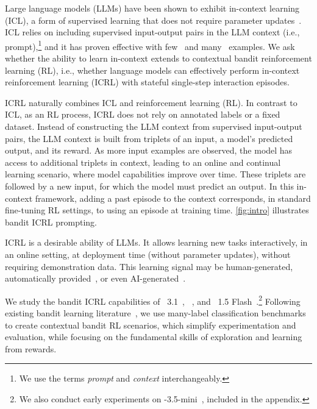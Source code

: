 Large language models (LLMs) have been shown to exhibit in-context learning (ICL), a form of supervised learning that does not require parameter updates~\citep{brown2020language}. 
ICL relies on including supervised input-output pairs in the LLM context (i.e., prompt),\footnote{We use the terms \emph{prompt} and \emph{context} interchangeably.} and it has proven effective with few~\citep{brown2020language} and many~\citep{bertsch2024incontext, agarwal2024manyshotincontextlearning} examples.
We ask whether the ability to learn in-context extends to contextual bandit reinforcement learning (RL), i.e., whether language models can effectively perform in-context reinforcement learning (ICRL) with stateful single-step interaction episodes. 

ICRL naturally combines ICL and reinforcement learning (RL). 
In contrast to ICL, as an RL process, ICRL does not rely on annotated labels or a fixed dataset. Instead of constructing the LLM context from supervised input-output pairs, the LLM context is built from triplets of an input, a model's predicted output, and its reward. As more input examples are observed, the model has access to additional triplets in context, leading to an online and continual learning scenario, where model capabilities improve over time. These triplets are followed by a new input, for which the model must predict an output. In this in-context framework, adding a past episode to the context corresponds, in standard fine-tuning RL settings, to using an episode at training time. \autoref{fig:intro} illustrates bandit ICRL prompting. 

ICRL is a desirable ability of LLMs. It allows learning new tasks interactively, in an online setting, at deployment time (without parameter updates), without requiring demonstration data. This learning signal may be human-generated, automatically provided~\citep[i.e., a program successfully completes; ][]{gehring2024rlefgroundingcodellms}, or even AI-generated~\citep{zhang2024generative}.





We study the bandit ICRL capabilities of \llama{}~3.1~\citep{dubey2024llama}, ~\citep{qwen2024qwen25}, and \gemini~1.5 Flash~\citep{geminiteam2024geminifamilyhighlycapable}.\footnote{We also conduct early experiments on  \phillm{}-3.5-mini~\citep{abdin2024phi3technicalreporthighly}, included in the appendix.}
Following existing bandit learning literature~\citep{pmlr-v97-zhang19b, bietti2021contextual}, we use many-label classification benchmarks to create contextual bandit RL scenarios, which simplify experimentation and evaluation, while focusing on the fundamental skills of exploration and learning from rewards. 










